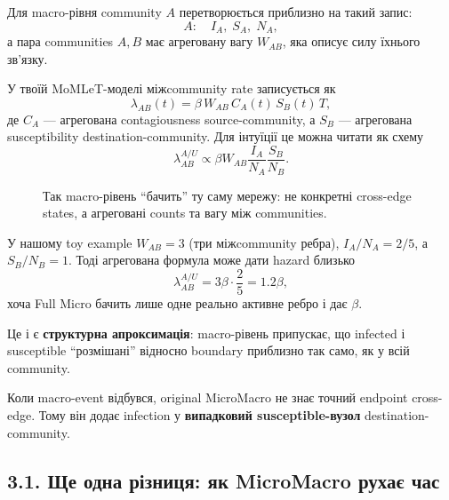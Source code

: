 \documentclass[11pt,a4paper]{article}
\begin{document}
Для macro-рівня community $A$ перетворюється приблизно на такий запис:
\[
 A:\quad I_A,\;S_A,\;N_A,
\]
а пара communities $A,B$ має агреговану вагу $W_{AB}$, яка описує силу їхнього зв'язку.

У твоїй MoMLeT-моделі міжcommunity rate записується як
\[
 \lambda_{AB}(t)=\beta\,W_{AB}\,C_A(t)\,S_B(t)\,T,
\]
де $C_A$ --- агрегована contagiousness source-community, а $S_B$ --- агрегована susceptibility destination-community. Для інтуїції це можна читати як схему
\[
 \lambda^{A/U}_{AB}\propto \beta W_{AB}\frac{I_A}{N_A}\frac{S_B}{N_B}.
\]

\begin{figure}[h!]
\centering
{}
\caption{Так macro-рівень ``бачить'' ту саму мережу: не конкретні cross-edge states, а агреговані counts та вагу між communities.}
\end{figure}

У нашому toy example $W_{AB}=3$ (три міжcommunity ребра), $I_A/N_A=2/5$, а $S_B/N_B=1$. Тоді агрегована формула може дати hazard близько
\[
 \lambda^{A/U}_{AB}=3\beta\cdot\frac{2}{5}=1.2\beta,
\]
хоча Full Micro бачить лише одне реально активне ребро і дає $\beta$.

Це і є \textbf{структурна апроксимація}: macro-рівень припускає, що infected і susceptible ``розмішані'' відносно boundary приблизно так само, як у всій community.

Коли macro-event відбувся, original MicroMacro не знає точний endpoint cross-edge. Тому він додає infection у \textbf{випадковий susceptible-вузол} destination-community.

\subsection*{3.1. Ще одна різниця: як MicroMacro рухає час}
\end{document}
